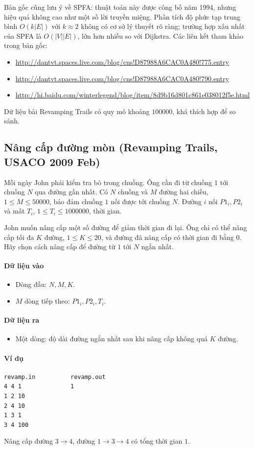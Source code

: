 \documentclass[11pt]{article}
\newcommand{\problem}[1]{\subsection{#1}}
\newcommand{\iosec}[1]{\paragraph{#1}}
\newcommand{\bigO}[1]{\ensuremath{O(#1)}}
\begin{document}
Bản gốc cũng lưu ý về SPFA: thuật toán này được công bố năm 1994, nhưng hiệu quả không cao như một số lời truyền miệng. Phân tích độ phức tạp trung bình \(\bigO{k|E|}\) với \(k\approx 2\) không có cơ sở lý thuyết rõ ràng; trường hợp xấu nhất của SPFA là \(\bigO{|V||E|}\), lớn hơn nhiều so với Dijkstra. Các liên kết tham khảo trong bản gốc:
\begin{itemize}
  \item \url{http://dantvt.spaces.live.com/blog/cns!D87988A6CAC0A480!775.entry}
  \item \url{http://dantvt.spaces.live.com/blog/cns!D87988A6CAC0A480!790.entry}
  \item \url{http://hi.baidu.com/winterlegend/blog/item/8d9b16d801c861e038012f5e.html}
\end{itemize}
Dữ liệu bài Revamping Trails có quy mô khoảng \(100000\), khá thích hợp để so sánh.

\problem{Nâng cấp đường mòn (Revamping Trails, USACO 2009 Feb)}

Mỗi ngày John phải kiểm tra bò trong chuồng. Ông cần đi từ chuồng \(1\) tới chuồng \(N\) qua đường gần nhất. Có \(N\) chuồng và \(M\) đường hai chiều, \(1 \le M \le 50000\), bảo đảm chuồng \(1\) nối được tới chuồng \(N\). Đường \(i\) nối \(P1_i,P2_i\) và mất \(T_i\), \(1 \le T_i \le 1000000\), thời gian.

John muốn nâng cấp một số đường để giảm thời gian đi lại. Ông chỉ có thể nâng cấp tối đa \(K\) đường, \(1 \le K \le 20\), và đường đã nâng cấp có thời gian đi bằng \(0\). Hãy chọn cách nâng cấp để đường từ \(1\) tới \(N\) ngắn nhất.

\iosec{Dữ liệu vào}
\begin{itemize}
  \item Dòng đầu: \(N,M,K\).
  \item \(M\) dòng tiếp theo: \(P1_i,P2_i,T_i\).
\end{itemize}

\iosec{Dữ liệu ra}
\begin{itemize}
  \item Một dòng: độ dài đường ngắn nhất sau khi nâng cấp không quá \(K\) đường.
\end{itemize}

\iosec{Ví dụ}
\begin{verbatim}
revamp.in          revamp.out
4 4 1              1
1 2 10
2 4 10
1 3 1
3 4 100
\end{verbatim}

Nâng cấp đường \(3\to4\), đường \(1\to3\to4\) có tổng thời gian \(1\).
\end{document}
